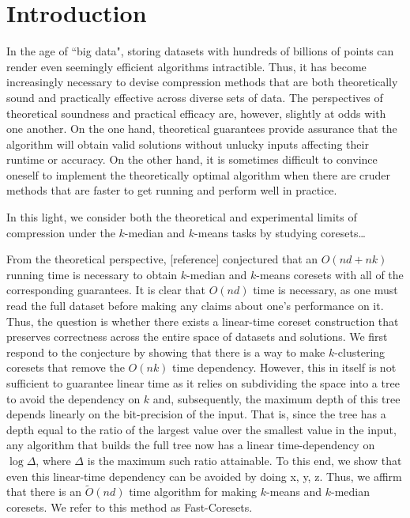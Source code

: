 \section{Introduction}

In the age of ``big data", storing datasets with hundreds of billions of points can render even seemingly efficient algorithms intractible. Thus, it has become
increasingly necessary to devise compression methods that are both theoretically sound and practically effective across diverse sets of data. The perspectives
of theoretical soundness and practical efficacy are, however, slightly at odds with one another. On the one hand, theoretical guarantees provide assurance that
the algorithm will obtain valid solutions without unlucky inputs affecting their runtime or accuracy. On the other hand, it is sometimes difficult to convince
oneself to implement the theoretically optimal algorithm when there are cruder methods that are faster to get running and perform well in practice.

In this light, we consider both the theoretical and experimental limits of compression under the $k$-median and $k$-means tasks by studying coresets\ldots %

From the theoretical perspective, [reference] conjectured that an $O(nd + nk)$ running time is necessary to obtain $k$-median and $k$-means coresets with all of
the corresponding guarantees. It is clear that $O(nd)$ time is necessary, as one must read the full dataset before making any claims about one's performance on
it.  Thus, the question is whether there exists a linear-time coreset construction that preserves correctness across the entire space of datasets and solutions.
We first respond to the conjecture by showing that there is a way to make $k$-clustering coresets that remove the $O(nk)$ time dependency.  However, this in
itself is not sufficient to guarantee linear time as it relies on subdividing the space into a tree to avoid the dependency on $k$ and, subsequently, the
maximum depth of this tree depends linearly on the bit-precision of the input. That is, since the tree has a depth equal to the ratio of the largest value over
the smallest value in the input, any algorithm that builds the full tree now has a linear time-dependency on $\log \Delta$, where $\Delta$ is the maximum
such ratio attainable. To this end, we show that even this linear-time dependency can be avoided by doing x, y, z. Thus, we affirm that there is an
$\tilde{O}(nd)$ time algorithm for making $k$-means and $k$-median coresets. We refer to this method as Fast-Coresets.

